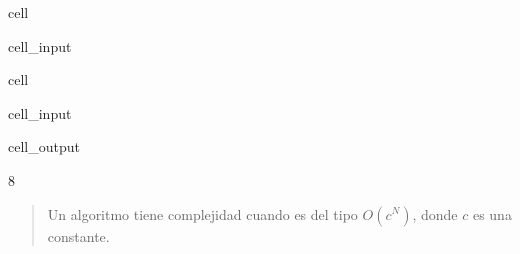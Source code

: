 \documentclass[letterpaper,10pt,english]{jupyterBook}
\begin{document}
\begin{sphinxuseclass}{cell}\begin{sphinxVerbatimInput}

\begin{sphinxuseclass}{cell_input}
\begin{sphinxVerbatim}[commandchars=\\\{\}]
 
    
       
          
            
        
     
\end{sphinxVerbatim}

\end{sphinxuseclass}\end{sphinxVerbatimInput}

\end{sphinxuseclass}
\begin{sphinxuseclass}{cell}\begin{sphinxVerbatimInput}

\begin{sphinxuseclass}{cell_input}
\begin{sphinxVerbatim}[commandchars=\\\{\}]
\end{sphinxVerbatim}

\end{sphinxuseclass}\end{sphinxVerbatimInput}
\begin{sphinxVerbatimOutput}

\begin{sphinxuseclass}{cell_output}
\begin{sphinxVerbatim}[commandchars=\\\{\}]
8
\end{sphinxVerbatim}

\end{sphinxuseclass}\end{sphinxVerbatimOutput}

\end{sphinxuseclass}\begin{quote}

\sphinxAtStartPar
{} Un algoritmo tiene complejidad  cuando es del tipo \(O(c^N)\), donde \(c\) es una constante.
\end{quote}
\end{document}
